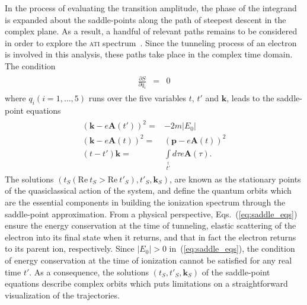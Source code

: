 In the process of evaluating the transition amplitude, the phase of
the integrand is expanded about the saddle-points along the path of
steepest descent in the complex plane. As a result, a handful of
relevant paths remains to be considered in order to explore the
\textsc{ati} spectrum~\cite{KopoldOptComm2000}. Since the tunneling
process of an electron is involved in this analysis, these paths take
place in the complex time domain.
%
The condition
\begin{eqnarray}
\label{eq:S_stationary}
\begin{split}
\frac{\partial S}{\partial q_{i}} & = & 0
\end{split}
\end{eqnarray}
where $q_{i}(i =1, \dots, 5)$ runs over the five variables $t$, $t'$
and $\mathbf{k}$, leads to the saddle-point
equations~\cite{Lewenstein_1995,KopoldOptComm2000}
%
\begin{eqnarray}
\label{eq:saddle_eqs}
\begin{split}
\left( \mathbf{k} - e\mathbf{A}(t') \right)^{2} = &
-2m|E_{0}| \\
\left( \mathbf{k} - e\mathbf{A}(t)\right)^{2} = &
\left( \mathbf{p} - e\mathbf{A}(t) \right)^{2} \\
(t - t') \mathbf{k} = & \int\limits_{t'}\limits^{t}
d\tau e\mathbf{A}(\tau).
\end{split}
\end{eqnarray}
%
The solutions $(t_{S}(\mathrm{Re}\ t_{S} > \mathrm{Re}\ t'_{S}),
t'_{S}, \mathbf{k}_{S})$, are known as the stationary points of the
quasiclassical action of the system, and define the quantum orbits
which are the essential components in building the ionization spectrum
through the saddle-point approximation. From a physical perspective,
Eqs.~(\ref{eq:saddle_eqs}) ensure the energy conservation at the time
of tunneling, elastic scattering of the electron into its final state
when it returns, and that in fact the electron returns to its parent
ion, respectively. Since $|E_{0}| > 0$ in~(\ref{eq:saddle_eqs}), the
condition of energy conservation at the time of ionization cannot be
satisfied for any real time $t'$. As a consequence, the solutions
$(t_{S}, t'_{S}, \mathbf{k}_{S})$ of the saddle-point equations
describe complex orbits which puts limitations on a straightforward
visualization of the trajectories.

